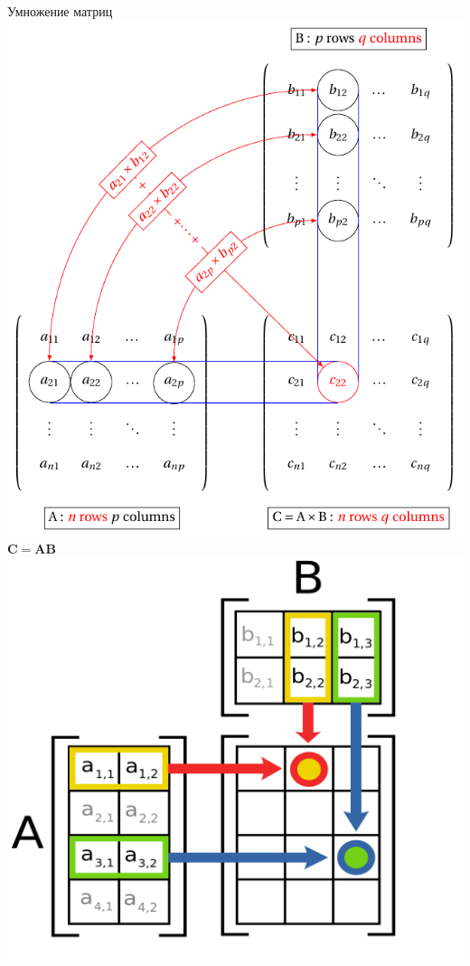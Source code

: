 \documentclass[10pt]{beamer}
\begin{document}
	\begin{frame}{Умножение матриц}
		{
			\includegraphics[width=\textwidth]{../L3/matrix-multiplication.image.pdf}
		}
		{
			$\mathbf C = \mathbf A \mathbf B$\\
			\includegraphics[width=\textwidth]{../L3/Matrix_multiplication_diagram_2.svg.png}
		}
		
	\end{frame}
	
\end{document}
